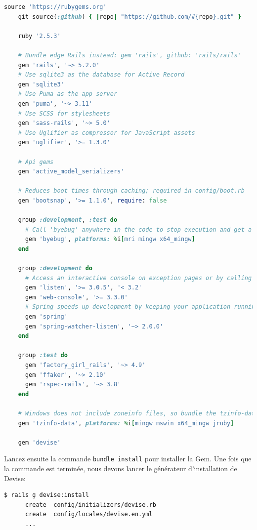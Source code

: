 \documentclass[]{report}
\begin{document}
    \begin{scriptsize}
    \begin{lstlisting}[language=ruby, caption={Le Gemfile avec l'ajout de Devise}, label={lst:add_devise_to_gemfile}]
    source 'https://rubygems.org'
    git_source(:github) { |repo| "https://github.com/#{repo}.git" }

    ruby '2.5.3'

    # Bundle edge Rails instead: gem 'rails', github: 'rails/rails'
    gem 'rails', '~> 5.2.0'
    # Use sqlite3 as the database for Active Record
    gem 'sqlite3'
    # Use Puma as the app server
    gem 'puma', '~> 3.11'
    # Use SCSS for stylesheets
    gem 'sass-rails', '~> 5.0'
    # Use Uglifier as compressor for JavaScript assets
    gem 'uglifier', '>= 1.3.0'

    # Api gems
    gem 'active_model_serializers'

    # Reduces boot times through caching; required in config/boot.rb
    gem 'bootsnap', '>= 1.1.0', require: false

    group :development, :test do
      # Call 'byebug' anywhere in the code to stop execution and get a debugger console
      gem 'byebug', platforms: %i[mri mingw x64_mingw]
    end

    group :development do
      # Access an interactive console on exception pages or by calling 'console' anywhere in the code.
      gem 'listen', '>= 3.0.5', '< 3.2'
      gem 'web-console', '>= 3.3.0'
      # Spring speeds up development by keeping your application running in the background. Read more: https://github.com/rails/spring
      gem 'spring'
      gem 'spring-watcher-listen', '~> 2.0.0'
    end

    group :test do
      gem 'factory_girl_rails', '~> 4.9'
      gem 'ffaker', '~> 2.10'
      gem 'rspec-rails', '~> 3.8'
    end

    # Windows does not include zoneinfo files, so bundle the tzinfo-data gem
    gem 'tzinfo-data', platforms: %i[mingw mswin x64_mingw jruby]

    gem 'devise'
    \end{lstlisting}
    \end{scriptsize}

    Lancez ensuite la commande \verb|bundle install| pour installer la Gem. Une fois que la commande est terminée, nous devons lancer le générateur d'installation de Devise:

    \begin{scriptsize}
    \begin{lstlisting}[language=bash]
    $ rails g devise:install
      create  config/initializers/devise.rb
      create  config/locales/devise.en.yml
      ...
    \end{lstlisting}
    \end{scriptsize}
\end{document}
